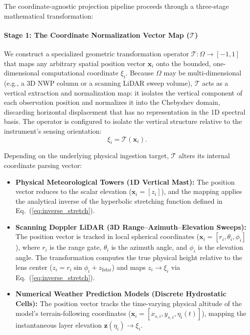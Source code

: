 The coordinate-agnostic projection pipeline proceeds through a three-stage mathematical transformation:

\paragraph{Stage 1: The Coordinate Normalization Vector Map ($\mathcal{T}$)}
We construct a specialized geometric transformation operator $\mathcal{T}: \Omega \rightarrow [-1, 1]$ that maps any arbitrary spatial position vector $\mathbf{x}_i$ onto the bounded, one-dimensional computational coordinate $\xi_i$. Because $\Omega$ may be multi-dimensional (e.g., a 3D NWP column or a scanning LiDAR sweep volume), $\mathcal{T}$ acts as a vertical extraction and normalization map: it isolates the vertical component of each observation position and normalizes it into the Chebyshev domain, discarding horizontal displacement that has no representation in the 1D spectral basis. The operator is configured to isolate the vertical structure relative to the instrument's sensing orientation:
\begin{equation}
\xi_i = \mathcal{T}(\mathbf{x}_i).
\label{eq:generalized_tau_map}
\end{equation}

Depending on the underlying physical ingestion target, $\mathcal{T}$ alters its internal coordinate parsing vector:
\begin{itemize}
\item \textbf{Physical Meteorological Towers (1D Vertical Mast):} The position vector reduces to the scalar elevation ($\mathbf{x}_i = [z_i]$), and the mapping applies the analytical inverse of the hyperbolic stretching function defined in Eq.~(\ref{eq:inverse_stretch}).
\item \textbf{Scanning Doppler LiDAR (3D Range--Azimuth--Elevation Sweeps):} The position vector is tracked in local spherical coordinates ($\mathbf{x}_i = [r_i, \theta_i, \phi_i]$), where $r_i$ is the range gate, $\theta_i$ is the azimuth angle, and $\phi_i$ is the elevation angle. The transformation computes the true physical height relative to the lens center ($z_i = r_i \sin \phi_i + z_{\mathrm{lidar}}$) and maps $z_i \rightarrow \xi_i$ via Eq.~(\ref{eq:inverse_stretch}).
\item \textbf{Numerical Weather Prediction Models (Discrete Hydrostatic Cells):} The position vector tracks the time-varying physical altitude of the model's terrain-following coordinates ($\mathbf{x}_i = [x_{s,i}, y_{s,i}, \eta_i(t)]$), mapping the instantaneous layer elevation $\mathbf{z}(\eta_i) \rightarrow \xi_i$.
\end{itemize}

